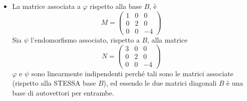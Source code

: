 \begin{enumerate}
\begin{itemize}
\item[c)] La matrice associata a $\varphi$ rispetto alla base $B$, \`{e} 
$$M = \left ( \begin{array}{rrr} 1 & 0 & 0 \\ 0 & 2 & 0 \\ 0 & 0 & -4 \end{array} \right )$$
Sia $\psi$ l'endomorfismo associato, rispetto a $B$, alla matrice
$$N = \left ( \begin{array}{rrr} 3 & 0 & 0 \\ 0 & 2 & 0 \\0 & 0 & -4 \end{array} \right )$$
$\varphi$ e $\psi$ sono linearmente indipendenti perch\'{e} tali sono le matrici associate (rispetto alla STESSA base $B$), ed essendo le due matrici diagonali $B$ \`{e} una base di autovettori per entrambe.
\end{itemize}

\end{enumerate}

